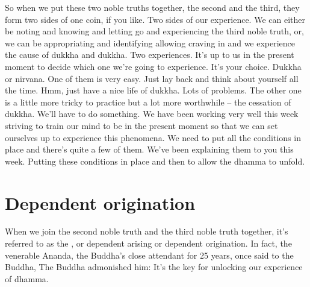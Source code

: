 \documentclass[letterpaper,10pt,english]{sphinxmanual}
\begin{document}
\sphinxAtStartPar
So  when  we  put  these  two  noble  truths  together,  the  second  and  the
third, they form two sides of one coin, if you like. Two sides of our experience. We can either be noting and knowing and letting go and experiencing
  the third noble truth, or, we can be appropriating and identifying allowing
craving in and we experience the cause of dukkha and dukkha. Two experiences. It’s up to us in the present moment to decide which one we’re going
to experience. It’s your choice. Dukkha or nirvana. One of them is very easy.
Just lay back and think about yourself all the time. Hmm, just have a nice life
of dukkha. Lots of problems. The other one is a little more tricky to practice
but a lot more worthwhile – the cessation of dukkha. We’ll have to do something. We have been working very well this week striving to train our mind
to be in the present moment so that we can set ourselves up to experience
this phenomena. We need to put all the conditions in place and there’s quite
a few of them. We’ve been explaining them to you this week. Putting these
conditions in place and then to allow the dhamma to unfold.


\section{Dependent origination}
\label{\detokenize{6-b:dependent-origination}}
\sphinxAtStartPar
When we join the second noble truth and the third noble truth together,
it’s referred to as the
, or dependent arising or dependent
origination.
In  fact,  the  venerable Ananda,  the  Buddha’s  close  attendant  for
25  years,  once  said  to  the  Buddha,
The Buddha admonished him:
It’s the key for
unlocking our experience of dhamma.
\end{document}
